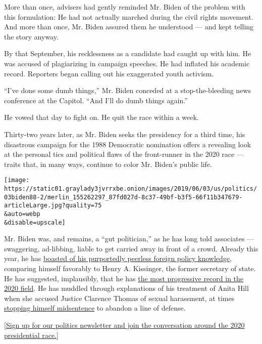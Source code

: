 More than once, advisers had gently reminded Mr. Biden of the problem
with this formulation: He had not actually marched during the civil
rights movement. And more than once, Mr. Biden assured them he
understood --- and kept telling the story anyway.

By that September, his recklessness as a candidate had caught up with
him. He was accused of plagiarizing in campaign speeches. He had
inflated his academic record. Reporters began calling out his
exaggerated youth activism.

``I've done some dumb things,'' Mr. Biden conceded at a
stop-the-bleeding news conference at the Capitol. ``And I'll do dumb
things again.''

He vowed that day to fight on. He quit the race within a week.

Thirty-two years later, as Mr. Biden seeks the presidency for a third
time, his disastrous campaign for the 1988 Democratic nomination offers
a revealing look at the personal tics and political flaws of the
front-runner in the 2020 race --- traits that, in many ways, continue to
color Mr. Biden's public life.

\texttt{[image: https://static01.graylady3jvrrxbe.onion/images/2019/06/03/us/politics/03biden88-2/merlin\_155262297\_87fd027d-8c37-49bf-b3f5-66f11b347679-articleLarge.jpg?quality=75\\\&auto=webp\\\&disable=upscale]}

Mr. Biden was, and remains, a ``gut politician,'' as he has long told
associates --- swaggering, ad-libbing, liable to get carried away in
front of a crowd. Already this year, he has
\href{https://www.cbsnews.com/news/biden-raises-more-than-100000-at-south-carolina-fundraiser/}{boasted
of his purportedly peerless foreign policy knowledge}, comparing himself
favorably to Henry A. Kissinger, the former secretary of state. He has
suggested, implausibly, that he has
\href{https://abcnews.go.com/Politics/video/biden-progressive-records-running-62735484}{the
most progressive record in the 2020 field}. He has muddled through
explanations of his treatment of Anita Hill when she accused Justice
Clarence Thomas of sexual harassment, at times
\href{https://www.nytimes3xbfgragh.onion/2019/04/26/us/politics/biden-the-view.html}{stopping
himself midsentence} to abandon a line of defense.

{[}\href{https://www.nytimes3xbfgragh.onion/newsletters/politics?smid=rd?action=click\&module=Intentional\&pgtype=Article}{Sign
up for our politics newsletter and join the conversation around the 2020
presidential race.}{]}

